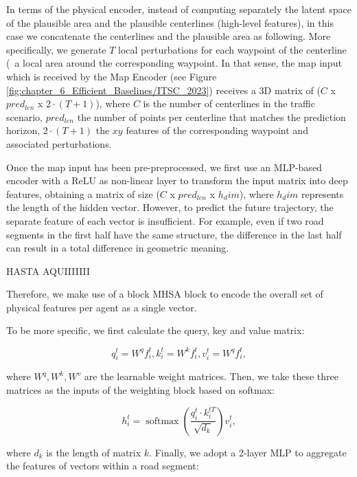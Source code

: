 In terms of the physical encoder, instead of computing separately the latent space of the plausible area and the plausible centerlines (high-level features), in this case we concatenate the centerlines and the plausible area as following. More specifically, we generate $T$ local perturbations for each waypoint of the centerline (\ie \ a local area around the corresponding waypoint. In that sense, the map input which is received by the Map Encoder (see Figure \ref{fig:chapter_6_Efficient_Baselines/ITSC_2023}) receives a 3D matrix of ($C$ x $pred_{len}$ x $2 \cdot (T+1)$), where $C$ is the number of centerlines in the traffic scenario, $pred_{len}$ the number of points per centerline that matches the prediction horizon, $2 \cdot (T+1)$ the $xy$ features of the corresponding waypoint and associated perturbations. 

Once the map input has been pre-preprocessed, we first use an \ac{MLP}-based encoder with a \ac{ReLU} as non-linear layer to transform the input matrix into deep features, obtaining a matrix of size ($C$ x $pred_{len}$ x $h_dim$), where $h_dim$ represents the length of the hidden vector. However, to predict the future trajectory, the separate feature of each vector is insufficient. For example, even if two road segments in the first half have the same structure, the difference in the last half can result in a total difference in geometric meaning. 

HASTA AQUIIIIIII

Therefore, we make use of a block \ac{MHSA} block to encode the overall set of physical features per agent as a single vector.

To be more specific, we first calculate the query, key and value matrix:

\begin{equation}
	q_i^t=W^q f_i^t, k_i^t=W^k f_i^t, v_i^t=W^q f_i^t,
\end{equation}

where $W^q, W^k, W^v$ are the learnable weight matrices. Then, we take these three matrices as the inputs of the weighting block based on softmax:

\begin{equation}
	h_i^t=\operatorname{softmax}\left(\frac{q_i^t \cdot k_i^{t T}}{\sqrt{d_k}}\right) v_i^t,
\end{equation}

where $d_k$ is the length of matrix $k$. Finally, we adopt a 2-layer MLP to aggregate the features of vectors within a road segment:

